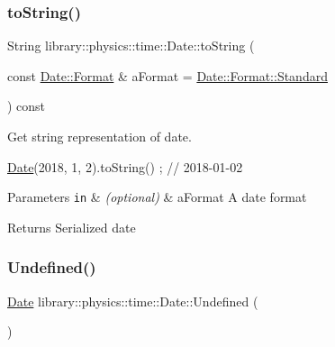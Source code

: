 \subsubsection{\texorpdfstring{to\+String()}{toString()}}
{\footnotesize\ttfamily String library\+::physics\+::time\+::\+Date\+::to\+String (\begin{DoxyParamCaption}\item[{const \hyperlink{classlibrary_1_1physics_1_1time_1_1_date_a97671e22ec7b7825cf99ead6d86d0bf7}{Date\+::\+Format} \&}]{a\+Format = {\ttfamily \hyperlink{classlibrary_1_1physics_1_1time_1_1_date_a97671e22ec7b7825cf99ead6d86d0bf7aeb6d8ae6f20283755b339c0dc273988b}{Date\+::\+Format\+::\+Standard}} }\end{DoxyParamCaption}) const}



Get string representation of date. 


\begin{DoxyCode}
\hyperlink{classlibrary_1_1physics_1_1time_1_1_date_a08e7d804b40b1bfaacbccd32cf79f292}{Date}(2018, 1, 2).toString() ; \textcolor{comment}{// 2018-01-02}
\end{DoxyCode}



\begin{DoxyParams}[1]{Parameters}
\mbox{\tt in}  & {\em (optional)} & a\+Format A date format \\
\hline
\end{DoxyParams}
\begin{DoxyReturn}{Returns}
Serialized date 
\end{DoxyReturn}
\mbox{\label{classlibrary_1_1physics_1_1time_1_1_date_a1fabcaeb4300781cc71e6cab35e158d1}} 
\subsubsection{\texorpdfstring{Undefined()}{Undefined()}}
{\footnotesize\ttfamily \hyperlink{classlibrary_1_1physics_1_1time_1_1_date}{Date} library\+::physics\+::time\+::\+Date\+::\+Undefined (\begin{DoxyParamCaption}{ }\end{DoxyParamCaption})\hspace{0.3cm}{\ttfamily [static]}}



